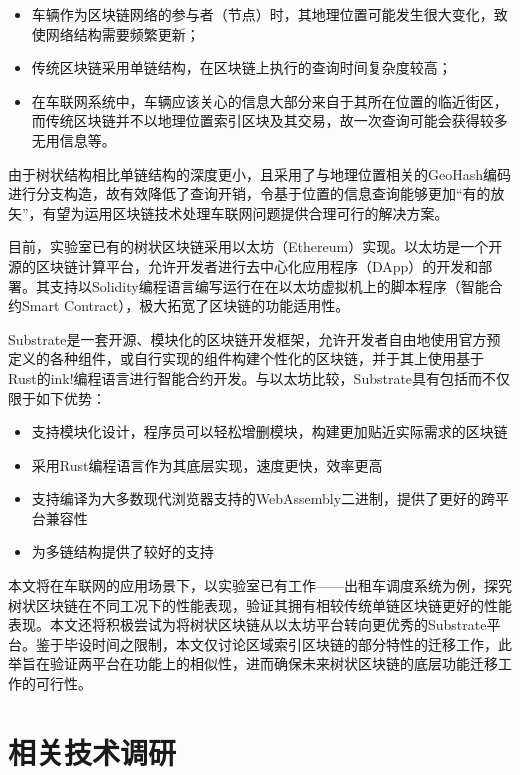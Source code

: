 \begin{itemize}
  \item 车辆作为区块链网络的参与者（节点）时，其地理位置可能发生很大变化，致使网络结构需要频繁更新；
  \item 传统区块链采用单链结构，在区块链上执行的查询时间复杂度较高；
  \item 在车联网系统中，车辆应该关心的信息大部分来自于其所在位置的临近街区，而传统区块链并不以地理位置索引区块及其交易，故一次查询可能会获得较多无用信息等。
\end{itemize}

由于树状结构相比单链结构的深度更小，且采用了与地理位置相关的GeoHash编码\cite{geohash}进行分支构造，故有效降低了查询开销，令基于位置的信息查询能够更加“有的放矢”，有望为运用区块链技术处理车联网问题提供合理可行的解决方案。

目前，实验室已有的树状区块链采用以太坊（Ethereum）实现。以太坊是一个开源的区块链计算平台，允许开发者进行去中心化应用程序（DApp）的开发和部署\cite{ethereumWhitePaper}。其支持以Solidity编程语言编写运行在在以太坊虚拟机上的脚本程序（智能合约Smart Contract），极大拓宽了区块链的功能适用性。

Substrate是一套开源、模块化的区块链开发框架\cite{substrateHome}，允许开发者自由地使用官方预定义的各种组件，或自行实现的组件构建个性化的区块链，并于其上使用基于Rust的ink!编程语言进行智能合约开发。与以太坊比较，Substrate具有包括而不仅限于如下优势：

\begin{itemize}
  \item 支持模块化设计，程序员可以轻松增删模块，构建更加贴近实际需求的区块链
  \item 采用Rust编程语言作为其底层实现，速度更快，效率更高
  \item 支持编译为大多数现代浏览器支持的WebAssembly二进制，提供了更好的跨平台兼容性
  \item 为多链结构提供了较好的支持
\end{itemize}

本文将在车联网的应用场景下，以实验室已有工作——出租车调度系统为例，探究树状区块链在不同工况下的性能表现，验证其拥有相较传统单链区块链更好的性能表现。本文还将积极尝试为将树状区块链从以太坊平台转向更优秀的Substrate平台。鉴于毕设时间之限制，本文仅讨论区域索引区块链的部分特性的迁移工作，此举旨在验证两平台在功能上的相似性，进而确保未来树状区块链的底层功能迁移工作的可行性。

\section{相关技术调研}

